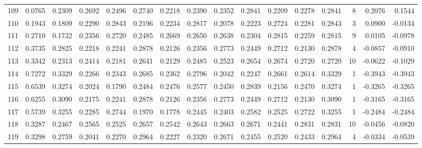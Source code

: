 \begin{tabular}{lrrrrrrrrrrrrrrr}
109 &      0.0765 &  0.2309 &  0.2692 &  0.2496 &  0.2740 &  0.2218 &  0.2390 &  0.2352 &  0.2841 &  0.2209 &   0.2278 &     0.2841 &      8 &                    0.2076 &                     0.1544 \\
110 &      0.1943 &  0.1809 &  0.2290 &  0.2843 &  0.2196 &  0.2234 &  0.2817 &  0.2078 &  0.2223 &  0.2724 &   0.2281 &     0.2843 &      3 &                    0.0900 &                    -0.0134 \\
111 &      0.2710 &  0.1732 &  0.2356 &  0.2720 &  0.2485 &  0.2669 &  0.2650 &  0.2638 &  0.2304 &  0.2815 &   0.2259 &     0.2815 &      9 &                    0.0105 &                    -0.0978 \\
112 &      0.3735 &  0.2825 &  0.2218 &  0.2241 &  0.2878 &  0.2126 &  0.2356 &  0.2773 &  0.2449 &  0.2712 &   0.2130 &     0.2878 &      4 &                   -0.0857 &                    -0.0910 \\
113 &      0.3342 &  0.2313 &  0.2414 &  0.2181 &  0.2641 &  0.2129 &  0.2485 &  0.2523 &  0.2654 &  0.2674 &   0.2720 &     0.2720 &     10 &                   -0.0622 &                    -0.1029 \\
114 &      0.7272 &  0.3329 &  0.2266 &  0.2343 &  0.2685 &  0.2362 &  0.2796 &  0.2042 &  0.2247 &  0.2661 &   0.2614 &     0.3329 &      1 &                   -0.3943 &                    -0.3943 \\
115 &      0.6539 &  0.3274 &  0.2024 &  0.1790 &  0.2484 &  0.2476 &  0.2577 &  0.2450 &  0.2839 &  0.2156 &   0.2470 &     0.3274 &      1 &                   -0.3265 &                    -0.3265 \\
116 &      0.6255 &  0.3090 &  0.2175 &  0.2241 &  0.2878 &  0.2126 &  0.2356 &  0.2773 &  0.2449 &  0.2712 &   0.2130 &     0.3090 &      1 &                   -0.3165 &                    -0.3165 \\
117 &      0.5739 &  0.3255 &  0.2285 &  0.2744 &  0.1970 &  0.1778 &  0.2445 &  0.2403 &  0.2582 &  0.2525 &   0.2722 &     0.3255 &      1 &                   -0.2484 &                    -0.2484 \\
118 &      0.3287 &  0.2467 &  0.2565 &  0.2525 &  0.2657 &  0.2542 &  0.2643 &  0.2663 &  0.2671 &  0.2441 &   0.2831 &     0.2831 &     10 &                   -0.0456 &                    -0.0820 \\
119 &      0.3298 &  0.2759 &  0.2041 &  0.2270 &  0.2964 &  0.2227 &  0.2320 &  0.2671 &  0.2455 &  0.2520 &   0.2433 &     0.2964 &      4 &                   -0.0334 &                    -0.0539 \\

\end{tabular}
